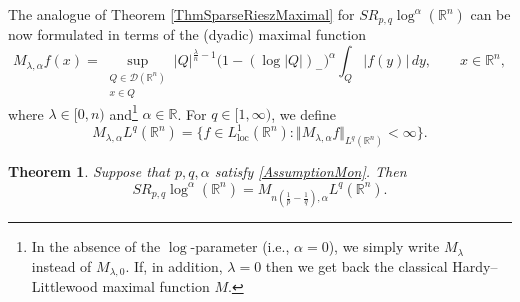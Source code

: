 \documentclass[11pt, a4paper,leqno]{amsart}
\newtheorem{theorem}{Theorem}
\theoremstyle{plain}
\numberwithin{equation}{section}
\theoremstyle{definition}
\theoremstyle{remark}
\begin{document}
The analogue of Theorem \ref{ThmSparseRieszMaximal} for $SR_{p,q}\log^{\alpha
}(\mathbb{R}^{n})$ can be now formulated in terms of the (dyadic) maximal
function
\begin{equation}
M_{\lambda,\alpha}f(x)=\sup_{\substack{Q\in\mathcal{D}(\mathbb{R}^{n})\\x\in
Q}}|Q|^{\frac{\lambda}{n}-1}\big(1-(\log|Q|)_{-}\big)^{\alpha}\int%
_{Q}|f(y)|\,dy,\qquad x\in\mathbb{R}^{n}, \label{maxlamRn}%
\end{equation}
where $\lambda\in\lbrack0,n)$ and\footnote{In the
absence of the $\log$-parameter (i.e., $\alpha=0$), we simply write
$M_{\lambda}$ instead of $M_{\lambda,0}$. If, in addition, $\lambda=0$ then we
get back the classical Hardy--Littlewood maximal function $M$.} $\alpha\in\mathbb{R}$. For
$q\in\lbrack1,\infty)$, we define
\[
M_{\lambda,\alpha}L^{q}(\mathbb{R}^{n})=\{f\in L_{\text{loc}}^{1}%
(\mathbb{R}^{n}):\Vert M_{\lambda,\alpha}f\Vert_{L^{q}(\mathbb{R}^{n})}%
<\infty\}.
\]


\begin{theorem}
\label{ThmSparseRieszMaximalRn} Suppose that $p,q, \alpha$ satisfy \eqref{AssumptionMon}.  Then
\[
SR_{p,q}\log^{\alpha}(\mathbb{R}^{n})=M_{n(\frac{1}{p}-\frac{1}{q}),\alpha
}L^{q}(\mathbb{R}^{n}).
\]

\end{theorem}
\end{document}

